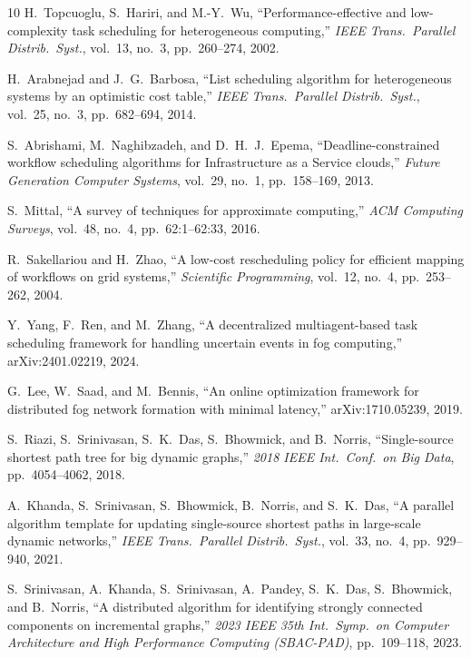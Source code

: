 \documentclass[11pt]{article}
\begin{document}
\begin{thebibliography}{10}
H.~Topcuoglu, S.~Hariri, and M.-Y.~Wu,
``Performance-effective and low-complexity task scheduling for
heterogeneous computing,'' \emph{IEEE Trans.\ Parallel Distrib.\
Syst.}, vol.~13, no.~3, pp.~260--274, 2002.

H.~Arabnejad and J.~G.~Barbosa,
``List scheduling algorithm for heterogeneous systems by an
optimistic cost table,'' \emph{IEEE Trans.\ Parallel Distrib.\
Syst.}, vol.~25, no.~3, pp.~682--694, 2014.

S.~Abrishami, M.~Naghibzadeh, and D.~H.~J.~Epema,
``Deadline-constrained workflow scheduling algorithms for
Infrastructure as a Service clouds,'' \emph{Future Generation
Computer Systems}, vol.~29, no.~1, pp.~158--169, 2013.

S.~Mittal,
``A survey of techniques for approximate computing,''
\emph{ACM Computing Surveys}, vol.~48, no.~4, pp.~62:1--62:33,
2016.

R.~Sakellariou and H.~Zhao,
``A low-cost rescheduling policy for efficient mapping of
workflows on grid systems,'' \emph{Scientific Programming},
vol.~12, no.~4, pp.~253--262, 2004.

Y.~Yang, F.~Ren, and M.~Zhang,
``A decentralized multiagent-based task scheduling framework for
handling uncertain events in fog computing,'' arXiv:2401.02219,
2024.

G.~Lee, W.~Saad, and M.~Bennis,
``An online optimization framework for distributed fog network
formation with minimal latency,'' arXiv:1710.05239, 2019.

S.~Riazi, S.~Srinivasan, S.~K.~Das, S.~Bhowmick, and B.~Norris,
``Single-source shortest path tree for big dynamic graphs,''
\emph{2018 IEEE Int.\ Conf.\ on Big Data}, pp.~4054--4062, 2018.

\bibitem{khanda2021sssp}
A.~Khanda, S.~Srinivasan, S.~Bhowmick, B.~Norris, and S.~K.~Das,
``A parallel algorithm template for updating single-source
shortest paths in large-scale dynamic networks,'' \emph{IEEE
Trans.\ Parallel Distrib.\ Syst.}, vol.~33, no.~4, pp.~929--940,
2021.

S.~Srinivasan, A.~Khanda, S.~Srinivasan, A.~Pandey, S.~K.~Das,
S.~Bhowmick, and B.~Norris,
``A distributed algorithm for identifying strongly connected
components on incremental graphs,'' \emph{2023 IEEE 35th Int.\
Symp.\ on Computer Architecture and High Performance Computing
(SBAC-PAD)}, pp.~109--118, 2023.

\end{thebibliography}
\end{document}
